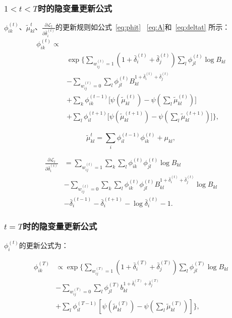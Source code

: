 \subsubsection{$1<t<T$时的隐变量更新公式}
$\phi_{ik}^{(t)}$、$\tilde{\mu}_{kl}^t$、$\frac{\partial \mathscr{L}_t}{\partial \bar{\delta}_i^{(t)}}$的更新规则如公式~\ref{eq:phit} ~\ref{eq:A}和~\ref{eq:deltat} 所示：
   \begin{equation}
   \begin{split}
   \phi_{ik}^{(t)} \propto \\
   &\exp\bigg\{ \sum_{w_{ij}^{(t)}=1} (1+\bar{\delta}_i^{(t)}+\bar{\delta}_j^{(t)}) \sum_l \phi_{jl}^{(t)} \log B_{kl} \\
   & -\sum_{w_{ij}^{(t)}=0} \sum_l \phi_{jl}^{(t)}  B_{kl}^{1+\bar{\delta}_i^{(t)}+\bar{\delta}_j^{(t)}}  \\
  & +\sum_k \phi_{ik}^{(t-1)} \Big[\psi(\tilde{\mu}_{kl}^{(t)}) - \psi(\sum_l \tilde{\mu}_{kl}^{(t)})\Big] \\
   &+ \sum_l \phi_{il}^{(t+1)} \Big[\psi(\tilde{\mu}_{kl}^{(t+1)}) - \psi(\sum_l \tilde{\mu}_{kl}^{(t+1)})\Big] \bigg\},
   \label{eq:phit}
   \end{split}
   \end{equation}

   \begin{equation}
   \tilde{\mu}_{kl}^t = \sum_i \phi_{il}^{(t-1)} \phi_{ik}^{(t)} + \mu_{kl},
   \label{eq:A}
   \end{equation}


\begin{align}
\frac{\partial \mathscr{L}_t}{\partial \bar{\delta}_i^{(t)}} & =\sum_{w_{ij}^{(t)}=1} \sum_k \sum_l \phi_{ik}^{(t)}\phi_{jl}^{(t)} \log B_{kl}  \nonumber\\
& -\sum_{w_{ij}^{(t)}=0} \sum_k \sum_l \phi_{ik}^{(t)}\phi_{jl}^{(t)}  B_{kl}^{1+\bar{\delta}_i^{(t)}+\bar{\delta}_j^{(t)}} \log B_{kl} \nonumber\\
& -\bar{\delta}_i^{(t-1)} - \bar{\delta}_i^{(t+1)} - \log \bar{\delta}_i^{(t)} - 1.
\label{eq:deltat}
\end{align}



\subsubsection{$t=T$时的隐变量更新公式}

$\phi_i^{(t)}$的更新公式为：


\begin{equation}
\begin{split}
\phi_{ik}^{(T)} & \propto \exp\{ \sum_{w_{ij}^{(T)}=1} (1+\bar{\delta}_i^{(T)}+\bar{\delta}_j^{(T)}) \sum_l \phi_{jl}^{(T)} \log B_{kl} \\
& -\sum_{w_{ij}^{(T)}=0} \sum_l \phi_{jl}^{(T)}  b_{kl}^{1+\bar{\delta}_i^{(T)}+\bar{\delta}_j^{(T)}}  \\
& + \sum_l \phi_{il}^{(T-1)} [\psi(\tilde{\mu}_{kl}^{(T)}) - \psi(\sum_l \tilde{\mu}_{kl}^{(T)})] \},
\end{split}
\label{eq:phiT}
\end{equation}

